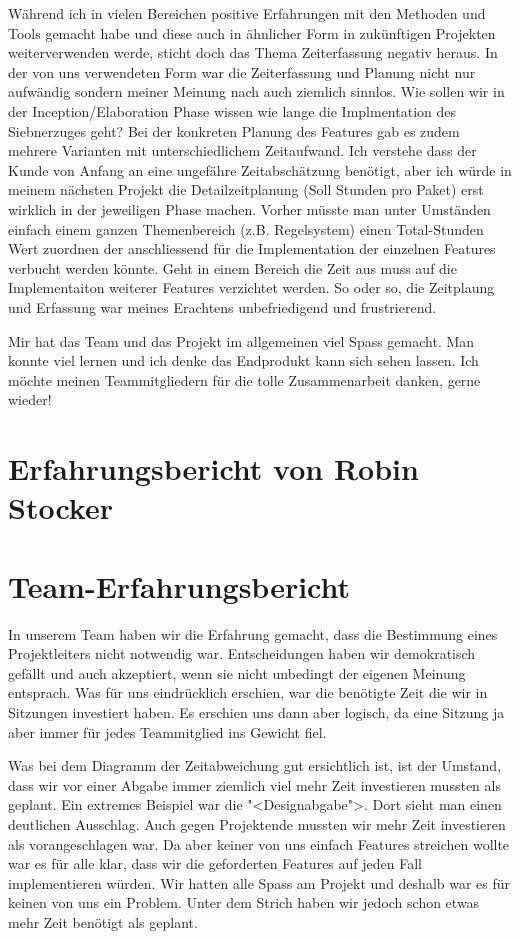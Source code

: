 \documentclass[12pt,halfparskip]{scrartcl}
\begin{document}
Während ich in vielen Bereichen positive Erfahrungen mit den Methoden und Tools gemacht habe und diese auch in ähnlicher Form in zukünftigen Projekten weiterverwenden werde, sticht doch das Thema Zeiterfassung negativ heraus. In der von uns verwendeten Form war die Zeiterfassung und Planung nicht nur aufwändig sondern meiner Meinung nach auch ziemlich sinnlos. Wie sollen wir in der Inception/Elaboration Phase wissen wie lange die Implmentation des Siebnerzuges geht? Bei der konkreten Planung des Features gab es zudem mehrere Varianten mit unterschiedlichem Zeitaufwand. Ich verstehe dass der Kunde von Anfang an eine ungefähre Zeitabschätzung benötigt, aber ich würde in meinem nächsten Projekt die Detailzeitplanung (Soll Stunden pro Paket) erst wirklich in der jeweiligen Phase machen. Vorher müsste man unter Umständen einfach einem ganzen Themenbereich (z.B. Regelsystem) einen Total-Stunden Wert zuordnen der anschliessend für die Implementation der einzelnen Features verbucht werden könnte. Geht in einem Bereich die Zeit aus muss auf die Implementaiton weiterer Features verzichtet werden. So oder so, die Zeitplaung und Erfassung war meines Erachtens unbefriedigend und frustrierend.

Mir hat das Team und das Projekt im allgemeinen viel Spass gemacht. Man konnte viel lernen und ich denke das Endprodukt kann sich sehen lassen. Ich möchte meinen Teammitgliedern für die tolle Zusammenarbeit danken, gerne wieder!

\section{Erfahrungsbericht von Robin Stocker}

\section{Team-Erfahrungsbericht}
In unserem Team haben wir die Erfahrung gemacht, dass die Bestimmung eines Projektleiters nicht notwendig war. Entscheidungen haben wir demokratisch gefällt und auch akzeptiert, wenn sie nicht unbedingt der eigenen Meinung entsprach. Was für uns eindrücklich erschien, war die benötigte Zeit die wir in Sitzungen investiert haben. Es erschien uns dann aber logisch, da eine Sitzung ja aber immer für jedes Teammitglied ins Gewicht fiel.

Was bei dem Diagramm der Zeitabweichung gut ersichtlich ist, ist der Umstand, dass wir vor einer Abgabe immer ziemlich viel mehr Zeit investieren mussten als geplant. Ein extremes Beispiel war die "<Designabgabe">. Dort sieht man einen deutlichen Ausschlag. Auch gegen Projektende mussten wir mehr Zeit investieren als vorangeschlagen war. Da aber keiner von uns einfach Features streichen wollte war es für alle klar, dass wir die geforderten Features auf jeden Fall implementieren würden. Wir hatten alle Spass am Projekt und deshalb war es für keinen von uns ein Problem. Unter dem Strich haben wir jedoch schon etwas mehr Zeit benötigt als geplant.
\end{document}
